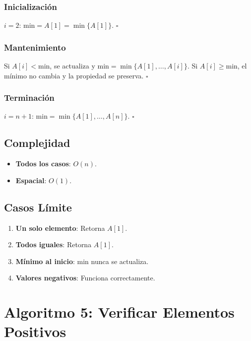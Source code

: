 \documentclass[11pt,a4paper]{article}
\begin{document}
\subsubsection{Inicialización}
$i = 2$: $\text{min} = A[1] = \min\{A[1]\}$. $\square$

\subsubsection{Mantenimiento}
Si $A[i] < \text{min}$, se actualiza y $\text{min} = \min\{A[1],\ldots,A[i]\}$. Si $A[i] \geq \text{min}$, el mínimo no cambia y la propiedad se preserva. $\square$

\subsubsection{Terminación}
$i = n+1$: $\text{min} = \min\{A[1], \ldots, A[n]\}$. $\square$

\subsection{Complejidad}
\begin{itemize}
    \item \textbf{Todos los casos}: $O(n)$.
    \item \textbf{Espacial}: $O(1)$.
\end{itemize}

\subsection{Casos Límite}
\begin{enumerate}
    \item \textbf{Un solo elemento}: Retorna $A[1]$.
    \item \textbf{Todos iguales}: Retorna $A[1]$.
    \item \textbf{Mínimo al inicio}: $\text{min}$ nunca se actualiza.
    \item \textbf{Valores negativos}: Funciona correctamente.
\end{enumerate}

\newpage

\section{Algoritmo 5: Verificar Elementos Positivos}
\end{document}
